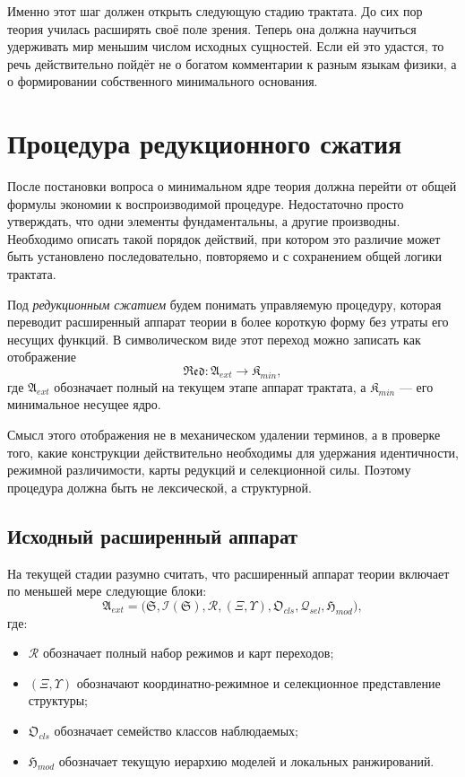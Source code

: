 \documentclass[12pt,a4paper]{article}
\begin{document}
Именно этот шаг должен открыть следующую стадию трактата. До сих пор теория училась расширять своё поле зрения. Теперь она должна научиться удерживать мир меньшим числом исходных сущностей. Если ей это удастся, то речь действительно пойдёт не о богатом комментарии к разным языкам физики, а о формировании собственного минимального основания.

\section{Процедура редукционного сжатия}

После постановки вопроса о минимальном ядре теория должна перейти от общей формулы экономии к воспроизводимой процедуре. Недостаточно просто утверждать, что одни элементы фундаментальны, а другие производны. Необходимо описать такой порядок действий, при котором это различие может быть установлено последовательно, повторяемо и с сохранением общей логики трактата.

Под \textit{редукционным сжатием} будем понимать управляемую процедуру, которая переводит расширенный аппарат теории в более короткую форму без утраты его несущих функций. В символическом виде этот переход можно записать как отображение
\begin{equation}
\mathfrak{Red}: \mathfrak{A}_{ext} \longrightarrow \mathfrak{K}_{min},
\end{equation}
где \(\mathfrak{A}_{ext}\) обозначает полный на текущем этапе аппарат трактата, а \(\mathfrak{K}_{min}\) --- его минимальное несущее ядро.

Смысл этого отображения не в механическом удалении терминов, а в проверке того, какие конструкции действительно необходимы для удержания идентичности, режимной различимости, карты редукций и селекционной силы. Поэтому процедура должна быть не лексической, а структурной.

\subsection{Исходный расширенный аппарат}

На текущей стадии разумно считать, что расширенный аппарат теории включает по меньшей мере следующие блоки:
\begin{equation}
\mathfrak{A}_{ext}=\bigl(\mathfrak{S},\mathcal{I}(\mathfrak{S}),\mathcal{R},(\Xi,\Upsilon),\mathfrak{O}_{cls},\mathcal{Q}_{sel},\mathfrak{H}_{mod}\bigr),
\end{equation}
где:
\begin{itemize}
    \item \(\mathcal{R}\) обозначает полный набор режимов и карт переходов;
    \item \((\Xi,\Upsilon)\) обозначают координатно-режимное и селекционное представление структуры;
    \item \(\mathfrak{O}_{cls}\) обозначает семейство классов наблюдаемых;
    \item \(\mathfrak{H}_{mod}\) обозначает текущую иерархию моделей и локальных ранжирований.
\end{itemize}
\end{document}
